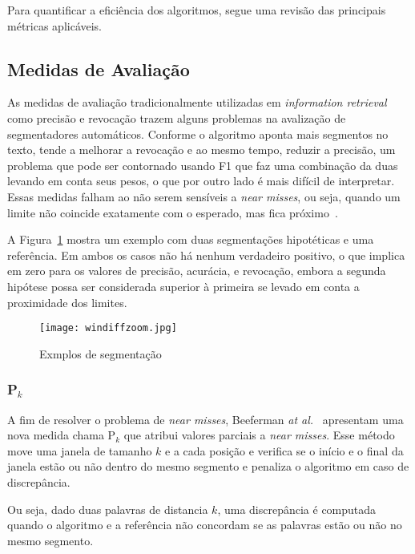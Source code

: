 Para quantificar a eficiência dos algoritmos, segue uma revisão das principais métricas aplicáveis.


\subsection{Medidas de Avaliação}


	As medidas de avaliação tradicionalmente utilizadas em \textit{information retrieval} como precisão e revocação trazem alguns problemas na avalização de segmentadores automáticos.  
Conforme o algoritmo aponta mais segmentos no texto, tende a melhorar a revocação e ao mesmo tempo, reduzir a precisão, um problema que pode ser contornado usando F1 que faz uma combinação da duas levando em conta seus pesos, o que por outro lado é mais difícil de interpretar. 
Essas medidas falham ao não serem sensíveis a \textit{near misses}, ou seja, quando um limite não coincide exatamente com o esperado, mas fica próximo~\cite{Kern2009167}.

A Figura~\ref{fig:exemplosegmentacaozoom} mostra um exemplo com duas segmentações hipotéticas e uma referência. Em ambos os casos não há nenhum verdadeiro positivo, o que implica em zero para os valores de precisão, acurácia, e revocação, embora a segunda hipótese possa ser considerada superior à primeira se levado em conta a proximidade dos limites.



  \begin{figure}[!h]

	\centering
	\texttt{[image: windiffzoom.jpg]}
	\caption{Exmplos de segmentação}
	\label{fig:exemplosegmentacaozoom}

  \end{figure}



\subsubsection{P$_k$}
A fim de resolver o problema de \textit{near misses}, Beeferman \textit{at al.}~\cite{Beeferman1999} apresentam uma nova medida chama P$_k$ que atribui valores parciais a \textit{near misses}. Esse método move uma janela de tamanho $k$ e a cada posição e verifica se o início e o final da janela estão ou não dentro do mesmo segmento e penaliza o algoritmo em caso de discrepância. 

Ou seja, dado duas palavras de distancia $k$, uma discrepância é computada quando o algoritmo e a referência não concordam se as palavras estão ou não no mesmo segmento.

